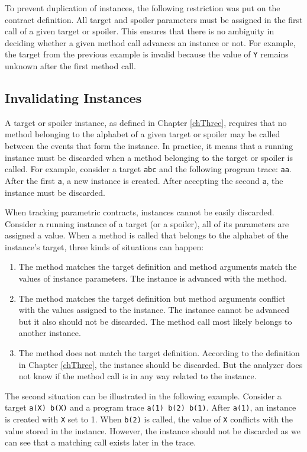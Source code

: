 To prevent duplication of instances, the following restriction was put on the
contract definition. All target and spoiler parameters must be assigned in the
first call of a given target or spoiler. This ensures that there is no ambiguity
in deciding whether a given method call advances an instance or not. For
example, the target from the previous example is invalid because the value of
\texttt{Y} remains unknown after the first method call.

\subsection{Invalidating Instances}

A target or spoiler instance, as defined in Chapter \ref{chThree}, requires that
no method belonging to the alphabet of a given target or spoiler may be called
between the events that form the instance. In practice, it means that a running
instance must be discarded when a method belonging to the target or spoiler is
called. For example, consider a target \texttt{abc} and the following program
trace: \texttt{aa}. After the first \texttt{a}, a new instance is created. After
accepting the second \texttt{a}, the instance must be discarded.

When tracking parametric contracts, instances cannot be easily discarded.
Consider a running instance of a target (or a spoiler), all of its parameters
are assigned a value. When a method is called that belongs to the alphabet of
the instance's target, three kinds of situations can happen:
\begin{enumerate}
    \item The method matches the target definition and method arguments match
        the values of instance parameters. The instance is advanced with the
        method.
    \item The method matches the target definition but method arguments conflict
        with the values assigned to the instance. The instance cannot be
        advanced but it also should not be discarded. The method call most
        likely belongs to another instance.
    \item The method does not match the target definition. According to the
        definition in Chapter \ref{chThree}, the instance should be discarded.
        But the analyzer does not know if the method call is in any way related
        to the instance.
\end{enumerate}

The second situation can be illustrated in the following example. Consider a
target \texttt{a(X) b(X)} and a program trace \texttt{a(1) b(2) b(1)}. After
\texttt{a(1)}, an instance is created with \texttt{X} set to 1. When
\texttt{b(2)} is called, the value of \texttt{X} conflicts with the value
stored in the instance. However, the instance should not be discarded as we can
see that a matching call exists later in the trace.

